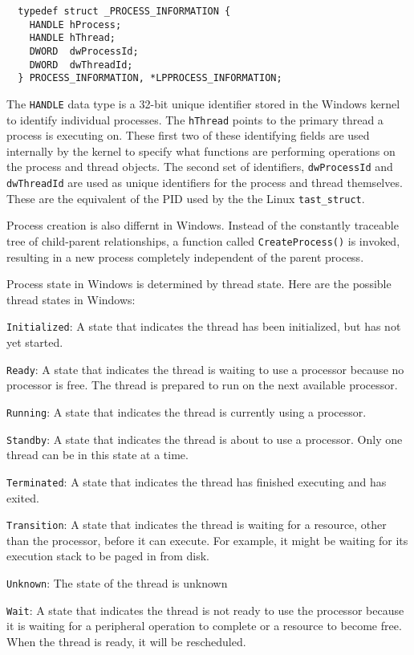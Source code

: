 \documentclass[10pt,letterpaper,onecolumn,draftclsnofoot]{IEEEtran}
\begin{document}
\begin{lstlisting}
  typedef struct _PROCESS_INFORMATION {
    HANDLE hProcess;
    HANDLE hThread;
    DWORD  dwProcessId;
    DWORD  dwThreadId;
  } PROCESS_INFORMATION, *LPPROCESS_INFORMATION;
\end{lstlisting}

The \texttt{HANDLE} data type is a 32-bit unique identifier stored in the Windows
kernel to identify individual processes.\cite{mshandle2016} The \texttt{hThread}
points to the primary thread a process is executing on. These first two of these
identifying fields are used internally by the kernel to specify what functions
are performing operations on the process and thread objects. The second set of
identifiers, \texttt{dwProcessId} and \texttt{dwThreadId} are used as unique
identifiers for the process and thread themselves. These are the equivalent of
the PID used by the the Linux \texttt{tast\_struct}.

Process creation is also differnt in Windows. Instead of the constantly traceable
tree of child-parent relationships, a function called \texttt{CreateProcess()} is
invoked, resulting in a new process completely independent of the parent process.
\cite{msproccreate2016}

Process state in Windows is determined by thread state. Here are the possible
thread states in Windows:\cite{msthreadstate2016}
\begin{description}
  \item \texttt{Initialized}: A state that indicates the thread has been initialized,
  but has not yet started.
  \item \texttt{Ready}: A state that indicates the thread is waiting to use a processor
  because no processor is free. The thread is prepared to run on the next
  available processor.
  \item \texttt{Running}: A state that indicates the thread is currently using a processor.
  \item \texttt{Standby}: A state that indicates the thread is about to use a processor.
  Only one thread can be in this state at a time.
  \item \texttt{Terminated}: A state that indicates the thread has finished executing
  and has exited.
  \item \texttt{Transition}: A state that indicates the thread is waiting for a resource, other than
  the processor, before it can execute. For example, it might be waiting for its
  execution stack to be paged in from disk.
  \item \texttt{Unknown}: The state of the thread is unknown
  \item \texttt{Wait}: A state that indicates the thread is not ready to use the processor
  because it is waiting for a peripheral operation to complete or a resource to
  become free. When the thread is ready, it will be rescheduled.
\end{description}
\end{document}
